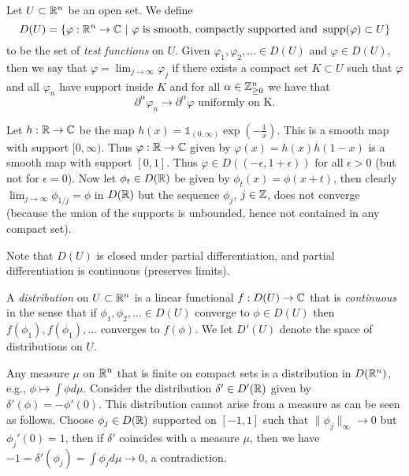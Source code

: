 \documentclass[twoside, a4paper, 10pt]{amsart}
\begin{document}
\begin{mydef} Let $U \subset \mathbb{R}^n$ be an open set. We define $$D(U) = \{ \varphi :\mathbb{R}^n \to \mathbb{C} ~|~ \varphi \text{ is smooth, compactly supported and } \operatorname{supp}(\varphi) \subset U  \}$$ to be the set of \textit{test functions} on $U$. Given $\varphi_1,\varphi_2, \ldots \in D(U)$ and $\varphi \in D(U)$, then we say that $\varphi = \lim_{j \to \infty} \varphi_j$ if there exists a compact set $K \subset U$ such that $\varphi$ and all $\varphi_n$ have support inside $K$ and for all $\alpha \in \mathbb{Z}_{\geq 0}^n$ we have that $$\partial^{\alpha} \varphi_n \to \partial^{\alpha} \varphi \text{ uniformly on K.}$$ 

\end{mydef}

\begin{eg} Let $h:\mathbb{R} \to \mathbb{C}$ be the map $h(x) = \mathds{1}_{(0,\infty)} \exp(-\frac{1}{x})$. This is a smooth map with support $[0, \infty)$. Thus $\varphi:\mathbb{R} \to \mathbb{C}$ given by $\varphi(x) = h(x)h(1-x)$ is a smooth map with support $[0,1]$. Thus $\varphi \in D((-\epsilon, 1 + \epsilon))$ for all $\epsilon >0$ (but not for $\epsilon = 0$). Now let $\phi_t \in D(\mathbb{R})$ be given by $\phi_t(x) = \phi(x+t)$, then clearly $\lim_{j \to \infty} \phi_{1/j} = \phi$ in $D(\mathbb{R})$ but the sequence $\phi_j$, $j \in \mathbb{Z}$, does not converge (because the union of the supports is unbounded, hence not contained in any compact set).
\end{eg}

Note that $D(U)$ is closed under partial differentiation, and partial differentiation is continuous (preserves limits).

\begin{mydef} A \textit{distribution} on $U \subset \mathbb{R}^n$ is a linear functional $f:D(U) \to \mathbb{C}$ that is \textit{continuous} in the sense that if $\phi_1, \phi_2,\ldots \in D(U)$ converge to $\phi \in D(U)$ then $f(\phi_1), f(\phi_1), \ldots$ converges to $f(\phi)$. We let $D'(U)$ denote the space of distributions on $U$. 

\end{mydef}

\begin{eg} Any measure $\mu$ on $\mathbb{R}^n$ that is finite on compact sets is a distribution in $D(\mathbb{R}^n)$, e.g., $\phi \mapsto \int \phi d\mu$. Consider the distribution $\delta' \in D'(\mathbb{R})$ given by $\delta'(\phi) = -\phi'(0)$. This distribution cannot arise from a measure as can be seen as follows. Choose $\phi_j \in D(\mathbb{R})$ supported on $[-1,1]$ such that $\| \phi_j \|_{\infty} \to 0$ but $\phi_j'(0) = 1$, then if $\delta'$ coincides with a measure $\mu$, then we have $-1 = \delta'(\phi_j) = \int \phi_j d\mu \to 0 $, a contradiction.

\end{eg}
\end{document}
